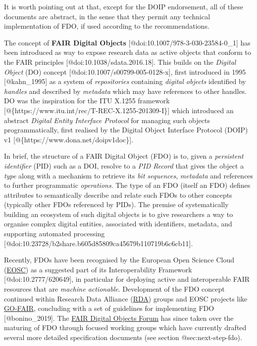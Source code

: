 It is worth pointing out at that, except for the DOIP endorsement, all
of these documents are abstract, in the sense that they permit any
technical implementation of FDO, if used according to the
recommendations.

The concept of \textbf{FAIR Digital Objects}
{[}@doi:10.1007/978-3-030-23584-0\_1{]} has been introduced as way to
expose research data as active objects that conform to the FAIR
principles {[}@doi:10.1038/sdata.2016.18{]}. This builds on the
\emph{Digital Object} (DO) concept {[}@doi:10.1007/s00799-005-0128-x{]},
first introduced in 1995 {[}@kahn\_1995{]} as a system of
\emph{repositories} containing \emph{digital objects} identified by
\emph{handles} and described by \emph{metadata} which may have
references to other handles. DO was the inspiration for the ITU X.1255
framework {[}@\{https://www.itu.int/rec/T-REC-X.1255-201309-I\}{]} which
introduced an abstract \emph{Digital Entity Interface Protocol} for
managing such objects programmatically, first realised by the Digital
Object Interface Protocol (DOIP) v1
{[}@\{https://www.dona.net/doipv1doc\}{]}.

In brief, the structure of a FAIR Digital Object (FDO) is to, given a
\emph{persistent identifier} (PID) such as a DOI, resolve to a \emph{PID
Record} that gives the object a \emph{type} along with a mechanism to
retrieve its \emph{bit sequences}, \emph{metadata} and references to
further programmatic \emph{operations}. The type of an FDO (itself an
FDO) defines attributes to semantically describe and relate such FDOs to
other concepts (typically other FDOs referenced by PIDs). The premise of
systematically building an ecosystem of such digital objects is to give
researchers a way to organise complex digital entities, associated with
identifiers, metadata, and supporting automated processing
{[}@doi:10.23728/b2share.b605d85809ca45679b110719b6c6cb11{]}.

Recently, FDOs have been recognised by the European Open Science Cloud
(\href{https://eosc.eu/}{EOSC}) as a suggested part of its
Interoperability Framework {[}@doi:10.2777/620649{]}, in particular for
deploying active and interoperable FAIR resources that are \emph{machine
actionable}. Development of the FDO concept continued within Research
Data Alliance (\href{https://www.rd-alliance.org/}{RDA}) groups and EOSC
projects like \href{https://www.go-fair.org/}{GO-FAIR}, concluding with
a set of guidelines for implementing FDO {[}@bonino\_2019{]}. The
\href{https://fairdo.org/}{FAIR Digital Objects Forum} has since taken
over the maturing of FDO through focused working groups which have
currently drafted several more detailed specification documents (see
section @sec:next-step-fdo).

